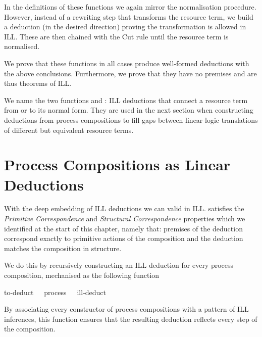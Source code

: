 \documentclass[class=smolathesis,crop=false]{standalone}
\begin{document}
In the definitions of these functions we again mirror the normalisation procedure.
However, instead of a rewriting step that transforms the resource term, we build a deduction (in the desired direction) proving the transformation is allowed in ILL\@.
These are then chained with the Cut rule until the resource term is normalised.

We prove that these functions in all cases produce well-formed deductions with the above conclusions.
Furthermore, we prove that they have no premises and are thus theorems of ILL\@.

We name the two functions  and : ILL deductions that connect a resource term from or to its normal form.
They are used in the next section when constructing deductions from process compositions to fill gaps between linear logic translations of different but equivalent resource terms.

\section{Process Compositions as Linear Deductions}
\label{sec:linearity/proc}

With the deep embedding of ILL deductions we can  valid in ILL\@.
 satisfies the \emph{Primitive Correspondence} and \emph{Structural Correspondence} properties which we identified at the start of this chapter, namely that: premises of the deduction correspond exactly to primitive actions of the composition and the deduction matches the composition in structure.

We do this by recursively constructing an ILL deduction for every process composition, mechanised as the following function
\begin{isabelle}
\centering
  to-deduct\ \ty\ \ process\ \isasymRightarrow\ \ ill-deduct
\end{isabelle}
By associating every constructor of process compositions with a pattern of ILL inferences, this function ensures that the resulting deduction reflects every step of the composition.
\end{document}
